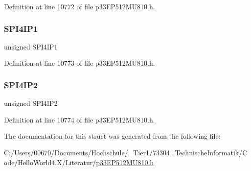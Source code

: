 Definition at line 10772 of file p33\+E\+P512\+M\+U810.\+h.

\mbox{\label{structtag_i_p_c30_b_i_t_s_aac82188760bffc0d0007e04877ed0f2a}} 
\subsubsection{\texorpdfstring{S\+P\+I4\+I\+P1}{SPI4IP1}}
{\footnotesize\ttfamily unsigned S\+P\+I4\+I\+P1}



Definition at line 10773 of file p33\+E\+P512\+M\+U810.\+h.

\mbox{\label{structtag_i_p_c30_b_i_t_s_ab73e96646562a4c063a9cbeda2ce65e0}} 
\subsubsection{\texorpdfstring{S\+P\+I4\+I\+P2}{SPI4IP2}}
{\footnotesize\ttfamily unsigned S\+P\+I4\+I\+P2}



Definition at line 10774 of file p33\+E\+P512\+M\+U810.\+h.



The documentation for this struct was generated from the following file\+:\begin{DoxyCompactItemize}
\item 
C\+:/\+Users/00670/\+Documents/\+Hochschule/\+\_\+\+Tier1/73304\+\_\+\+Technische\+Informatik/\+Code/\+Hello\+World4.\+X/\+Literatur/\hyperlink{p33_e_p512_m_u810_8h}{p33\+E\+P512\+M\+U810.\+h}\end{DoxyCompactItemize}
